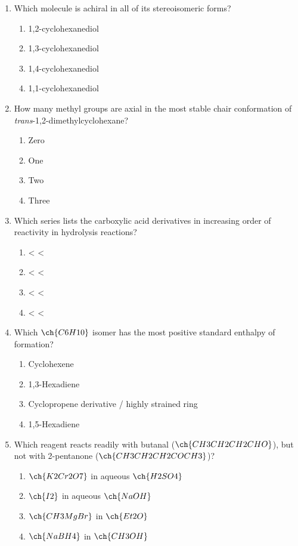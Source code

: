 \documentclass[twocolumn,10pt]{article}
\begin{document}
\begin{enumerate}[label=\arabic*., leftmargin=*]
\item Which molecule is achiral in all of its stereoisomeric forms?
\begin{enumerate}[label=(\Alph*)]
    \item 1,2-cyclohexanediol
    \item 1,3-cyclohexanediol
    \item 1,4-cyclohexanediol
    \item 1,1-cyclohexanediol
\end{enumerate}

\item How many methyl groups are axial in the most stable chair conformation of \textit{trans}-1,2-dimethylcyclohexane?
\begin{enumerate}[label=(\Alph*)]
    \item Zero \item One \item Two \item Three
\end{enumerate}

\item Which series lists the carboxylic acid derivatives in increasing order of reactivity in hydrolysis reactions?
\begin{enumerate}[label=(\Alph*)]
    \item {} <  < 
    \item {} <  < 
    \item {} <  < 
    \item {} <  < 
\end{enumerate}

\item Which $\ch{C6H10}$ isomer has the most positive standard enthalpy of formation?
\begin{enumerate}[label=(\Alph*)]
    \item Cyclohexene
    \item 1,3-Hexadiene
    \item Cyclopropene derivative / highly strained ring
    \item 1,5-Hexadiene
\end{enumerate}

\item Which reagent reacts readily with butanal ($\ch{CH3CH2CH2CHO}$), but not with 2-pentanone ($\ch{CH3CH2CH2COCH3}$)?
\begin{enumerate}[label=(\Alph*)]
    \item $\ch{K2Cr2O7}$ in aqueous $\ch{H2SO4}$
    \item $\ch{I2}$ in aqueous $\ch{NaOH}$
    \item $\ch{CH3MgBr}$ in $\ch{Et2O}$
    \item $\ch{NaBH4}$ in $\ch{CH3OH}$
\end{enumerate}


\end{enumerate}
\end{document}
